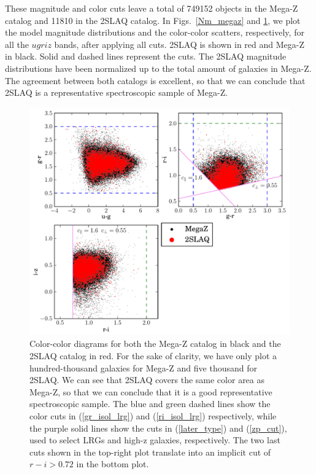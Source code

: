 These magnitude and color cuts leave a total of 749152 objects in the Mega-Z catalog and 11810 in the 2SLAQ catalog. In Figs.~\ref{Nm_megaz} and \ref{colors_megaz}, we plot the model magnitude distributions and the color-color scatters, respectively, for all the $ugriz$ bands, after applying all cuts. 2SLAQ is shown in red and Mega-Z in black. Solid and dashed lines represent the cuts. The 2SLAQ magnitude distributions have been normalized up to the total amount of galaxies in Mega-Z. The agreement between both catalogs is excellent, so that we can conclude that 2SLAQ is a representative spectroscopic sample of Mega-Z.
\begin{figure}
\centering
\includegraphics[type=pdf,ext=.pdf,read=.pdf, width=130mm]{./plots/colors_megaz}
\caption{Color-color diagrams for both the Mega-Z catalog in black and the 2SLAQ catalog in red. For the sake of clarity, we have only plot a hundred-thousand galaxies for Mega-Z and five thousand for 2SLAQ. We can see that 2SLAQ covers the same color area as Mega-Z, so that we can conclude that it is a good representative spectroscopic sample. The blue and green dashed lines show the color cuts in (\ref{gr_isol_lrg}) and (\ref{ri_isol_lrg}) respectively, while the purple solid lines show the cuts in (\ref{later_type}) and (\ref{zp_cut}), used to select LRGs and high-z galaxies, respectively. The two last cuts shown in the top-right plot translate into an implicit cut of $r-i>0.72$ in the bottom plot.}
\label{colors_megaz}
\end{figure}


